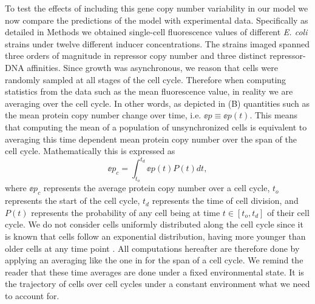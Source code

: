 To test the effects of including this gene copy number variability in our model
we now compare the predictions of the model with experimental data.
Specifically as detailed in Methods we obtained single-cell fluorescence values
of different {\it E. coli} strains under twelve different inducer
concentrations. The strains imaged spanned three orders of magnitude in
repressor copy number and three distinct repressor-DNA affinities. Since growth
was asynchronous, we reason that cells were randomly sampled at all stages of
the cell cycle. Therefore when computing statistics from the data such as the
mean fluorescence value, in reality we are averaging over the cell cycle. In
other words, as depicted in (B) quantities such as the
mean protein copy number change over time, i.e. $\ee{p} \equiv \ee{p(t)}$. This
means that computing the mean of a population of unsynchronized cells is
equivalent to averaging this time dependent mean protein copy number over the
span of the cell cycle. Mathematically this is expressed as
\begin{equation}
	\ee{p}_c = \int_{t_o}^{t_d} \ee{p(t)} P(t) dt,
	\label{eq_time_avg}
\end{equation}
where $\ee{p}_c$ represents the average protein copy number over a cell cycle,
$t_o$ represents the start of the cell cycle, $t_d$ represents the time of cell
division, and $P(t)$ represents the probability of any cell being at time $t
\in [t_o, t_d]$ of their cell cycle. We do not consider cells uniformly
distributed along the cell cycle since it is known that cells follow an
exponential distribution, having more younger than older cells at any time
point \cite{Powell1956}. All computations hereafter are therefore done by
applying an averaging like the one in  for the span of a cell
cycle. We remind the reader that these time averages are done under a fixed
environmental state. It is the trajectory of cells over cell cycles under a
constant environment what we need to account for.

